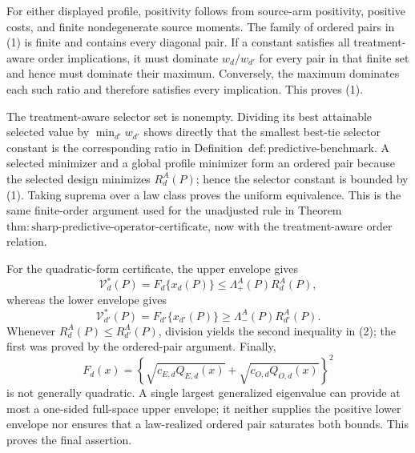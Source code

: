 For either displayed profile, positivity follows from source-arm positivity, positive costs, and finite nondegenerate source moments. The family of ordered pairs in (1) is finite and contains every diagonal pair. If a constant satisfies all treatment-aware order implications, it must dominate \(w_d/w_{d'}\) for every pair in that finite set and hence must dominate their maximum. Conversely, the maximum dominates each such ratio and therefore satisfies every implication. This proves (1).

The treatment-aware selector set is nonempty. Dividing its best attainable selected value by \(\min_{d'}w_{d'}\) shows directly that the smallest best-tie selector constant is the corresponding ratio in Definition~\(\mathrm{def{:}predictive\text{-}benchmark}\). A selected minimizer and a global profile minimizer form an ordered pair because the selected design minimizes \(R_d^A(P)\); hence the selector constant is bounded by (1). Taking suprema over a law class proves the uniform equivalence. This is the same finite-order argument used for the unadjusted rule in Theorem~\(\mathrm{thm{:}sharp\text{-}predictive\text{-}operator\text{-}certificate}\), now with the treatment-aware order relation.

For the quadratic-form certificate, the upper envelope gives
\[
 \mathcal V_d^*(P)=F_d\{x_d(P)\}
 \le\Lambda_+^A(P)R_d^A(P),
\]
whereas the lower envelope gives
\[
 \mathcal V_{d'}^*(P)=F_{d'}\{x_{d'}(P)\}
 \ge\Lambda_-^A(P)R_{d'}^A(P).
\]
Whenever \(R_d^A(P)\le R_{d'}^A(P)\), division yields the second inequality in (2); the first was proved by the ordered-pair argument. Finally,
\[
 F_d(x)=\left\{\sqrt{c_{E,d}Q_{E,d}(x)}+\sqrt{c_{O,d}Q_{O,d}(x)}\right\}^2
\]
is not generally quadratic. A single largest generalized eigenvalue can provide at most a one-sided full-space upper envelope; it neither supplies the positive lower envelope nor ensures that a law-realized ordered pair saturates both bounds. This proves the final assertion.